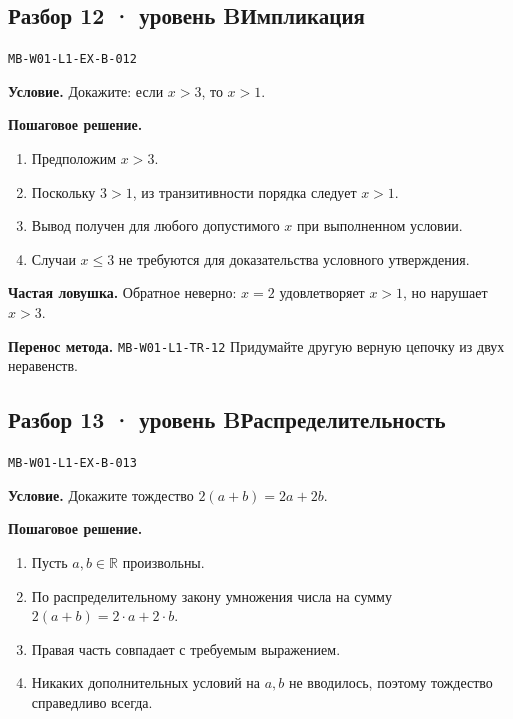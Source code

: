 \documentclass[11pt,a4paper,openany]{book}
\newcommand{\mtag}[1]{\textsf{\small\color{mbaccent}\bfseries #1}}
\newcommand{\muid}[1]{\texttt{\footnotesize #1}}
\begin{document}
\subsection*{\mtag{Разбор 12 · уровень B}\quad Импликация}\hypertarget{MB-W01-L1-EX-B-012}{}

\muid{MB-W01-L1-EX-B-012}\par

\begin{keybox}\textbf{Условие.} Докажите: если $x>3$, то $x>1$.\end{keybox}

\textbf{Пошаговое решение.}\par
\begin{enumerate}[label=\arabic*),leftmargin=*,itemsep=3pt,topsep=4pt]
\item Предположим $x>3$.
\item Поскольку $3>1$, из транзитивности порядка следует $x>1$.
\item Вывод получен для любого допустимого $x$ при выполненном условии.
\item Случаи $x\le3$ не требуются для доказательства условного утверждения.
\end{enumerate}


\begin{learnbox}\textbf{Частая ловушка.} Обратное неверно: $x=2$ удовлетворяет $x>1$, но нарушает $x>3$.\par \textbf{Перенос метода.} \muid{MB-W01-L1-TR-12} Придумайте другую верную цепочку из двух неравенств.\end{learnbox}

\subsection*{\mtag{Разбор 13 · уровень B}\quad Распределительность}\hypertarget{MB-W01-L1-EX-B-013}{}

\muid{MB-W01-L1-EX-B-013}\par

\begin{keybox}\textbf{Условие.} Докажите тождество $2(a+b)=2a+2b$.\end{keybox}

\textbf{Пошаговое решение.}\par
\begin{enumerate}[label=\arabic*),leftmargin=*,itemsep=3pt,topsep=4pt]
\item Пусть $a,b\in\mathbb R$ произвольны.
\item По распределительному закону умножения числа на сумму $2(a+b)=2\cdot a+2\cdot b$.
\item Правая часть совпадает с требуемым выражением.
\item Никаких дополнительных условий на $a,b$ не вводилось, поэтому тождество справедливо всегда.
\end{enumerate}
\end{document}
